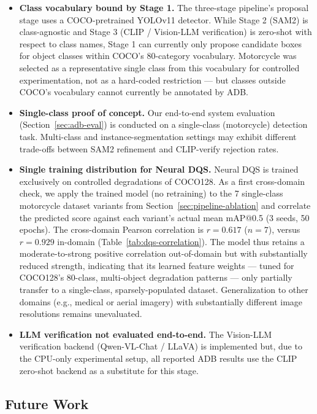 \documentclass[11pt]{article}
\begin{document}
\begin{itemize}
\item \textbf{Class vocabulary bound by Stage 1.} The three-stage pipeline's
  proposal stage uses a COCO-pretrained YOLOv11 detector. While Stage 2
  (SAM2) is class-agnostic and Stage 3 (CLIP / Vision-LLM verification) is
  zero-shot with respect to class names, Stage 1 can currently only propose
  candidate boxes for object classes within COCO's 80-category vocabulary.
  Motorcycle was selected as a representative single class from this
  vocabulary for controlled experimentation, not as a hard-coded
  restriction --- but classes outside COCO's vocabulary cannot currently be
  annotated by ADB.
\item \textbf{Single-class proof of concept.} Our end-to-end system
  evaluation (Section~\ref{sec:adb-eval}) is conducted on a single-class
  (motorcycle) detection task. Multi-class and instance-segmentation settings
  may exhibit different trade-offs between SAM2 refinement and CLIP-verify
  rejection rates.
\item \textbf{Single training distribution for Neural DQS.} Neural DQS is
  trained exclusively on controlled degradations of COCO128. As a first
  cross-domain check, we apply the trained model (no retraining) to the 7
  single-class motorcycle dataset variants from
  Section~\ref{sec:pipeline-ablation} and correlate the predicted score
  against each variant's actual mean mAP@0.5 (3 seeds, 50 epochs). The
  cross-domain Pearson correlation is $r=0.617$ ($n=7$), versus $r=0.929$
  in-domain (Table~\ref{tab:dqs-correlation}). The model thus retains a
  moderate-to-strong positive correlation out-of-domain but with
  substantially reduced strength, indicating that its learned feature
  weights --- tuned for COCO128's 80-class, multi-object degradation
  patterns --- only partially transfer to a single-class, sparsely-populated
  dataset. Generalization to other domains (e.g., medical or aerial imagery)
  with substantially different image resolutions remains unevaluated.
\item \textbf{LLM verification not evaluated end-to-end.} The Vision-LLM
  verification backend (Qwen-VL-Chat / LLaVA) is implemented but, due to the
  CPU-only experimental setup, all reported ADB results use the CLIP
  zero-shot backend as a substitute for this stage.
\end{itemize}

\subsection{Future Work}
\label{sec:future}
\end{document}
